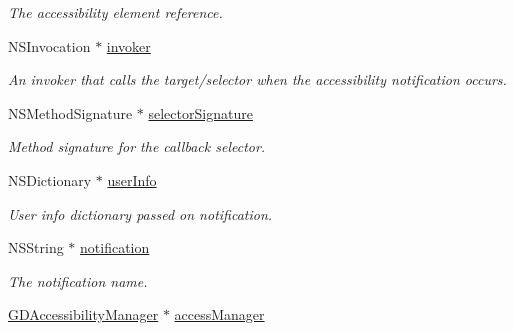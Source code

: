 \begin{DoxyCompactItemize}
\begin{DoxyCompactList}\small\item\em The accessibility element reference. \item\end{DoxyCompactList}\item 
\hypertarget{interface_g_d_accessibility_observer_a774accc02652787c3b86155670f429d0}{
NSInvocation $\ast$ \hyperlink{interface_g_d_accessibility_observer_a774accc02652787c3b86155670f429d0}{invoker}}
\label{interface_g_d_accessibility_observer_a774accc02652787c3b86155670f429d0}

\begin{DoxyCompactList}\small\item\em An invoker that calls the target/selector when the accessibility notification occurs. \item\end{DoxyCompactList}\item 
\hypertarget{interface_g_d_accessibility_observer_a2e79126b8de057ec798c5239121d5e1f}{
NSMethodSignature $\ast$ \hyperlink{interface_g_d_accessibility_observer_a2e79126b8de057ec798c5239121d5e1f}{selectorSignature}}
\label{interface_g_d_accessibility_observer_a2e79126b8de057ec798c5239121d5e1f}

\begin{DoxyCompactList}\small\item\em Method signature for the callback selector. \item\end{DoxyCompactList}\item 
\hypertarget{interface_g_d_accessibility_observer_a312f2dcd2e9adc830363f237d56b45e8}{
NSDictionary $\ast$ \hyperlink{interface_g_d_accessibility_observer_a312f2dcd2e9adc830363f237d56b45e8}{userInfo}}
\label{interface_g_d_accessibility_observer_a312f2dcd2e9adc830363f237d56b45e8}

\begin{DoxyCompactList}\small\item\em User info dictionary passed on notification. \item\end{DoxyCompactList}\item 
\hypertarget{interface_g_d_accessibility_observer_a273d26e83f52937320762c53857c6db1}{
NSString $\ast$ \hyperlink{interface_g_d_accessibility_observer_a273d26e83f52937320762c53857c6db1}{notification}}
\label{interface_g_d_accessibility_observer_a273d26e83f52937320762c53857c6db1}

\begin{DoxyCompactList}\small\item\em The notification name. \item\end{DoxyCompactList}\item 
\hypertarget{interface_g_d_accessibility_observer_a719a5c28d6ad27bbcab4b864868291fa}{
\hyperlink{interface_g_d_accessibility_manager}{GDAccessibilityManager} $\ast$ \hyperlink{interface_g_d_accessibility_observer_a719a5c28d6ad27bbcab4b864868291fa}{accessManager}}
\label{interface_g_d_accessibility_observer_a719a5c28d6ad27bbcab4b864868291fa}


\end{DoxyCompactItemize}
